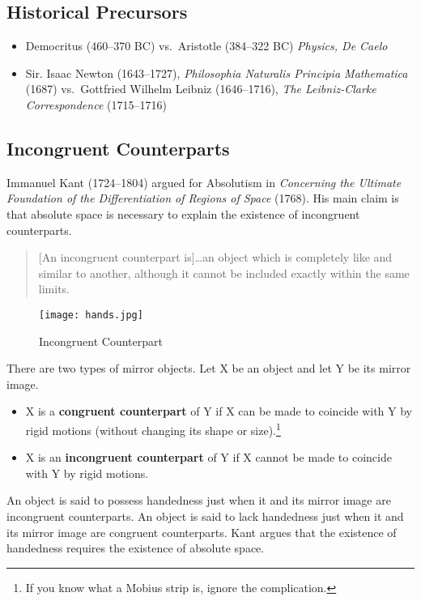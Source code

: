 \documentclass[oneside]{article}
\begin{document}
\subsection*{Historical Precursors}\label{historical-precursors}

\begin{itemize}
\item
  Democritus (460--370 BC) vs.~Aristotle (384--322 BC) \emph{Physics, De
  Caelo}
\item
  Sir. Isaac Newton (1643--1727), \emph{Philosophia Naturalis Principia
  Mathematica} (1687) vs.~Gottfried Wilhelm Leibniz (1646--1716),
  \emph{The Leibniz-Clarke Correspondence} (1715--1716)
\end{itemize}

\newpage

\subsection*{Incongruent Counterparts}\label{incongruent-counterparts}




Immanuel Kant (1724--1804) argued for Absolutism in \emph{Concerning the
Ultimate Foundation of the Differentiation of Regions of Space} (1768).
His main claim is that absolute space is necessary to explain the existence of
incongruent counterparts.



\begin{quote}
{[}An incongruent counterpart is{]}\ldots{}an object which is completely
like and similar to another, although it cannot be included exactly
within the same limits.
\end{quote}


\begin{figure}[h]
  \texttt{[image: hands.jpg]}
  \caption{Incongruent Counterpart}
\end{figure}
There are two types of mirror objects. Let X be an object and let Y be
its mirror image.

\begin{itemize}

\item
  X is a \textbf{congruent counterpart} of Y if X can be made to
  coincide with Y by rigid motions (without changing its shape or
  size).\footnote{If you know what a Mobius strip is, ignore the
    complication.}
\item
  X is an \textbf{incongruent counterpart} of Y if X cannot be made to
  coincide with Y by rigid motions.
\end{itemize}
An object is said to possess handedness just when it and its mirror
image are incongruent counterparts. An object is said to lack handedness just when it and its mirror image are congruent counterparts. Kant argues that the existence of handedness requires the existence of absolute space.
\end{document}
